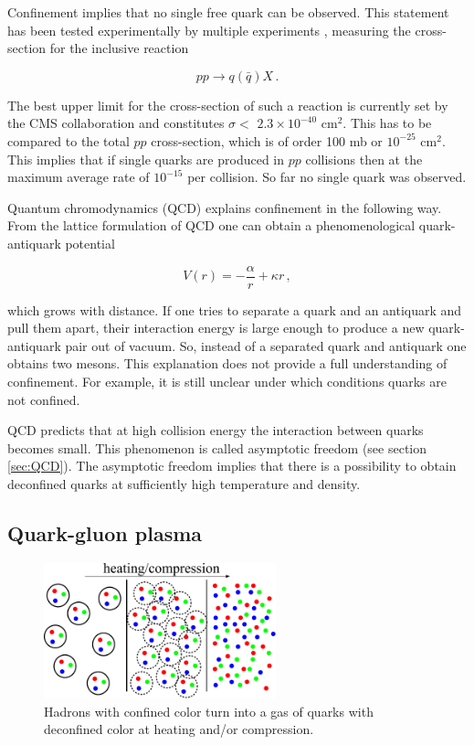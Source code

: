 Confinement implies that no single free quark can be observed. This statement
has been tested experimentally by multiple experiments \cite{Agashe:2014kda},
measuring the cross-section for the inclusive reaction

\begin{equation}
  pp \to q(\bar{q}) X \,. \nonumber
\end{equation}

The best upper limit for the cross-section of such a reaction is currently set by the
CMS collaboration and constitutes $\sigma < $ $2.3 \times 10^{-40}$ cm$^2$.
This has to be compared to the total $pp$ cross-section, which is of order
100 mb or $10^{-25}$ cm$^2$. This implies that if single quarks
are produced in $pp$ collisions then at the maximum average rate of $10^{-15}$ per
collision. So far no single quark was observed.

Quantum chromodynamics (QCD) explains confinement in the following way.
From the lattice formulation of QCD one can obtain a phenomenological
quark-antiquark potential

\begin{equation}
  V(r) = -\frac{\alpha}{r} + \kappa r \,,
\end{equation}

which grows with distance. If one tries to separate a quark and an antiquark and
pull them apart, their interaction energy is large enough to produce a new
quark-antiquark pair out of vacuum. So, instead of a separated quark and antiquark
one obtains two mesons. This explanation does not provide a full understanding
of confinement. For example, it is still unclear under which conditions quarks
are not confined.

QCD predicts that at high collision energy the interaction between quarks becomes
small. This phenomenon is called asymptotic freedom (see section \ref{sec:QCD}). The
asymptotic freedom implies that there is a possibility to obtain deconfined quarks
at sufficiently high temperature and density.

\subsection{Quark-gluon plasma}

\begin{figure}
  \centering
  \includegraphics[width = 0.6\textwidth]{illustrations/intro_illustrations/qgp.pdf}
  \caption{Hadrons with confined color turn into a gas of quarks
           with deconfined color at heating and/or compression.}
  \label{fig:qgp}
\end{figure}


